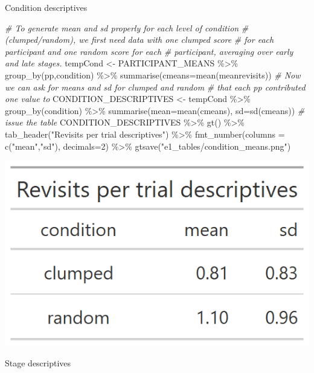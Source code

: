 \documentclass[
]{book}
\newenvironment{Shaded}{\begin{snugshade}}{\end{snugshade}}
\newcommand{\AttributeTok}[1]{\textcolor[rgb]{0.77,0.63,0.00}{#1}}
\newcommand{\CommentTok}[1]{\textcolor[rgb]{0.56,0.35,0.01}{\textit{#1}}}
\newcommand{\DecValTok}[1]{\textcolor[rgb]{0.00,0.00,0.81}{#1}}
\newcommand{\FunctionTok}[1]{\textcolor[rgb]{0.00,0.00,0.00}{#1}}
\newcommand{\NormalTok}[1]{#1}
\newcommand{\OtherTok}[1]{\textcolor[rgb]{0.56,0.35,0.01}{#1}}
\newcommand{\SpecialCharTok}[1]{\textcolor[rgb]{0.00,0.00,0.00}{#1}}
\newcommand{\StringTok}[1]{\textcolor[rgb]{0.31,0.60,0.02}{#1}}
\begin{document}
Condition descriptives

\begin{Shaded}
\begin{Highlighting}[]
\CommentTok{\# To generate mean and sd properly for each level of condition }
\CommentTok{\# (clumped/random), we first need data with one clumped score }
\CommentTok{\# for each participant and one random score for each }
\CommentTok{\# participant, averaging over early and late stages.}
\NormalTok{tempCond }\OtherTok{\textless{}{-}}\NormalTok{ PARTICIPANT\_MEANS }\SpecialCharTok{\%\textgreater{}\%} 
  \FunctionTok{group\_by}\NormalTok{(pp,condition) }\SpecialCharTok{\%\textgreater{}\%} \FunctionTok{summarise}\NormalTok{(}\AttributeTok{cmeans=}\FunctionTok{mean}\NormalTok{(meanrevisits))}
\CommentTok{\# Now we can ask for means and sd for clumped and random }
\CommentTok{\# that each pp contributed one value to}
\NormalTok{CONDITION\_DESCRIPTIVES }\OtherTok{\textless{}{-}}\NormalTok{ tempCond }\SpecialCharTok{\%\textgreater{}\%} 
  \FunctionTok{group\_by}\NormalTok{(condition) }\SpecialCharTok{\%\textgreater{}\%} 
  \FunctionTok{summarise}\NormalTok{(}\AttributeTok{mean=}\FunctionTok{mean}\NormalTok{(cmeans), }\AttributeTok{sd=}\FunctionTok{sd}\NormalTok{(cmeans))}
\CommentTok{\# issue the table}
\NormalTok{CONDITION\_DESCRIPTIVES }\SpecialCharTok{\%\textgreater{}\%} 
  \FunctionTok{gt}\NormalTok{() }\SpecialCharTok{\%\textgreater{}\%} 
  \FunctionTok{tab\_header}\NormalTok{(}\StringTok{"Revisits per trial descriptives"}\NormalTok{) }\SpecialCharTok{\%\textgreater{}\%} 
  \FunctionTok{fmt\_number}\NormalTok{(}\AttributeTok{columns =} \FunctionTok{c}\NormalTok{(}\StringTok{"mean"}\NormalTok{,}\StringTok{"sd"}\NormalTok{), }\AttributeTok{decimals=}\DecValTok{2}\NormalTok{) }\SpecialCharTok{\%\textgreater{}\%} 
  \FunctionTok{gtsave}\NormalTok{(}\StringTok{"e1\_tables/condition\_means.png"}\NormalTok{)}
\end{Highlighting}
\end{Shaded}

\includegraphics[width=0.33\linewidth]{e1_figures/CONDITION_DESCRIPTIVES-1}

Stage descriptives
\end{document}
